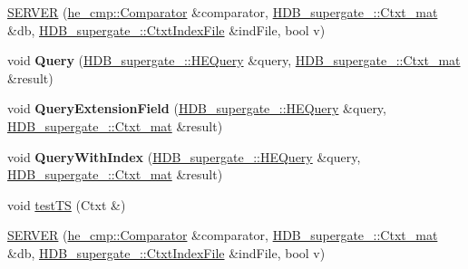 \begin{DoxyCompactItemize}
\item 
\hyperlink{classHDB__supergate__server___1_1SERVER_ab8168d1e8d3ee76b908eca8422cf97e5}{S\+E\+R\+V\+ER} (\hyperlink{classhe__cmp_1_1Comparator}{he\+\_\+cmp\+::\+Comparator} \&comparator, \hyperlink{namespaceHDB__supergate___a46a3fb2b98c95dc7615203376c4ad0c8}{H\+D\+B\+\_\+supergate\+\_\+\+::\+Ctxt\+\_\+mat} \&db, \hyperlink{classHDB__supergate___1_1CtxtIndexFile}{H\+D\+B\+\_\+supergate\+\_\+\+::\+Ctxt\+Index\+File} \&ind\+File, bool v)
\item 
\mbox{\label{classHDB__supergate__server___1_1SERVER_a531add9c79f48572fa08f0461abffd8d}} 
void {\bfseries Query} (\hyperlink{classHDB__supergate___1_1HEQuery}{H\+D\+B\+\_\+supergate\+\_\+\+::\+H\+E\+Query} \&query, \hyperlink{namespaceHDB__supergate___a46a3fb2b98c95dc7615203376c4ad0c8}{H\+D\+B\+\_\+supergate\+\_\+\+::\+Ctxt\+\_\+mat} \&result)
\item 
\mbox{\label{classHDB__supergate__server___1_1SERVER_a188dcd9aa9335e639516b32b01d67ce4}} 
void {\bfseries Query\+Extension\+Field} (\hyperlink{classHDB__supergate___1_1HEQuery}{H\+D\+B\+\_\+supergate\+\_\+\+::\+H\+E\+Query} \&query, \hyperlink{namespaceHDB__supergate___a46a3fb2b98c95dc7615203376c4ad0c8}{H\+D\+B\+\_\+supergate\+\_\+\+::\+Ctxt\+\_\+mat} \&result)
\item 
\mbox{\label{classHDB__supergate__server___1_1SERVER_ae404dee7ba0db1e12420edecbab2ba55}} 
void {\bfseries Query\+With\+Index} (\hyperlink{classHDB__supergate___1_1HEQuery}{H\+D\+B\+\_\+supergate\+\_\+\+::\+H\+E\+Query} \&query, \hyperlink{namespaceHDB__supergate___a46a3fb2b98c95dc7615203376c4ad0c8}{H\+D\+B\+\_\+supergate\+\_\+\+::\+Ctxt\+\_\+mat} \&result)
\item 
void \hyperlink{classHDB__supergate__server___1_1SERVER_a4b6051325021088c25ad409b302cef55}{test\+TS} (Ctxt \&)
\item 
\hyperlink{classHDB__supergate__server___1_1SERVER_ab8168d1e8d3ee76b908eca8422cf97e5}{S\+E\+R\+V\+ER} (\hyperlink{classhe__cmp_1_1Comparator}{he\+\_\+cmp\+::\+Comparator} \&comparator, \hyperlink{namespaceHDB__supergate___a46a3fb2b98c95dc7615203376c4ad0c8}{H\+D\+B\+\_\+supergate\+\_\+\+::\+Ctxt\+\_\+mat} \&db, \hyperlink{classHDB__supergate___1_1CtxtIndexFile}{H\+D\+B\+\_\+supergate\+\_\+\+::\+Ctxt\+Index\+File} \&ind\+File, bool v)

\end{DoxyCompactItemize}

